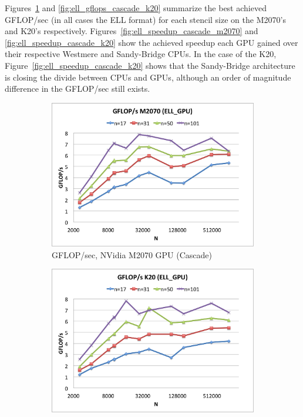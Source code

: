\documentclass{report}
\begin{document}
Figures~\ref{fig:ell_gflops_cascade_m2070} and \ref{fig:ell_gflops_cascade_k20} summarize the best achieved GFLOP/sec (in all cases the ELL format) for each stencil size on the M2070's and K20's respectively. Figures~\ref{fig:ell_speedup_cascade_m2070} and \ref{fig:ell_speedup_cascade_k20} show the achieved speedup each GPU gained over their respective Westmere and Sandy-Bridge CPUs. In the case of the K20, Figure~\ref{fig:ell_speedup_cascade_k20} shows that the Sandy-Bridge architecture is closing the divide between CPUs and GPUs, although an order of magnitude difference in the GFLOP/sec still exists.

\begin{figure} 
\centering
\begin{subfigure}[t]{0.48\textwidth}
\centering
\includegraphics[width=\textwidth]{gpu_content/cascade_spmv/ell_comparison_cascade_m2070.png}
\caption{GFLOP/sec, NVidia M2070 GPU (Cascade)}
\label{fig:ell_gflops_cascade_m2070}
\end{subfigure}
\quad
\begin{subfigure}[t]{0.48\textwidth}
\centering
\includegraphics[width=\textwidth]{gpu_content/cascade_spmv/ell_comparison_cascade_k20.png}

\end{subfigure}
\end{figure}
\end{document}
